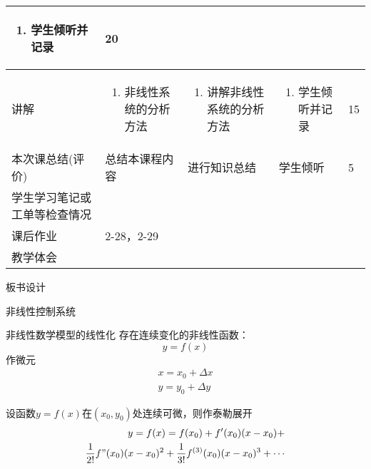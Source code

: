 {\begin{landscape}
\begin{longtable}{|m{10mm}|m{50mm}|m{50mm}|m{50mm}|m{15mm}|}
\begin{enumerate}
\item 学生倾听并记录
\end{enumerate} &20 \\\hline
讲解&\begin{enumerate}
\item 非线性系统的分析方法
\end{enumerate}
&\begin{enumerate}
\item 讲解非线性系统的分析方法
\end{enumerate} &\begin{enumerate}
\item 学生倾听并记录
\end{enumerate} &15 \\\hline

\centering 本次课总结(评价)&总结本课程内容 &进行知识总结 &学生倾听 &5 \\\hline
\centering 学生学习笔记或工单等检查情况&\multicolumn{4}{m{165mm}|}{\quad}\\\hline
\centering 课后作业&\multicolumn{4}{m{165mm}|}{2-28，2-29}\\\hline
\centering 教学体会&\multicolumn{4}{m{165mm}|}{\quad}\\
\end{longtable}

\end{landscape}
\clearpage
\begin{center}
{\huge 板书设计}
\end{center}
}

 \begin{frame}{非线性控制系统} 
 \begin{block}{非线性数学模型的线性化}
 存在连续变化的非线性函数：
 \[ y=f(x)\]
 作微元
 \begin{eqnarray*}
 x=x_0+\Delta x\\
 y=y_0+\Delta y
 \end{eqnarray*}
 \end{block}
 \end{frame}
 
 \begin{frame}
 \begin{block}{}
 设函数$y=f(x)$在$(x_0,y_0)$处连续可微，则作泰勒展开
\begin{eqnarray*}
y=f(x)=f(x_0)+f'(x_0)(x-x_0)+\\
\frac{1}{2!}f"(x_0)(x-x_0)^2+\frac{1}{3!}f^{(3)}(x_0)(x-x_0)^3+\cdots
\end{eqnarray*}
\end{block}
\end{frame}

